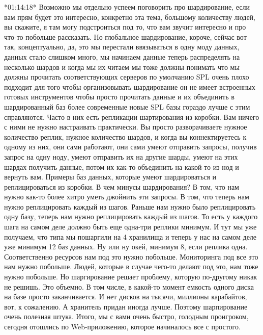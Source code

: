 \documentclass[12pt]{article} %
\begin{document}
*01:14:18*
Возможно мы отдельно успеем поговорить про шардирование, если вам прям будет это интересно, конкретно эта тема, большому количеству людей, вы скажите, я там могу подстроиться под то, что вам звучит интересно и про что-то побольше рассказать.  Но глобальное шардирование, короче, сейчас вот так, концептуально, да, это мы перестали ввязываться в одну моду данных, данных стало слишком много, мы начинаем данные теперь распределять на несколько шардов и когда мы их читаем мы тоже должны понимать что мы должны прочитать соответствующих серверов по умолчанию SPL очень плохо подходит для того чтобы организовывать шардирование он не имеет встроенных готовых инструментов чтобы просто прочитать данные и их объединить в шардированный баз более современные новые SPL базы гораздо лучше с этим справляются.  Часто в них есть репликации шартирования из коробки.  Вам ничего с ними не нужно настраивать практически.  Вы просто разворачиваете нужное количество реплик, нужное количество шардов, и когда вы коннектируетесь к одному из них, они сами работают, они сами умеют отправить запросы, получив запрос на одну ноду, умеют отправить их на другие шарды, умеют на этих шардах получить данные, потом их как-то объединить на какой-то из нод и вернуть вам.  Примеры баз данных, которые умеют шардироваться и реплицироваться из коробки.  В чем минусы шардирования?  В том, что нам нужно как-то более хитро уметь джойнить эти запросы.  В том, что теперь нам нужно реплицировать каждый из шагов.  Раньше нам нужно было реплицировать одну базу, теперь нам нужно реплицировать каждый из шагов.  То есть у каждого шага на самом деле должно быть еще одна-три реплики минимум.  И тут мы уже получаем, что типа мы пошаргили на 4 хранилища и теперь у нас на самом деле уже минимум 12 баз данных.  Ну или ну окей, минимум 8, если реплика одна.  Соответственно ресурсов нам под это нужно побольше.  Мониторинга под все это нам нужно побольше.  Людей, которые в случае чего-то делают под это, нам тоже нужно побольше.  Но шаргирование решает проблему, которую по-другому никак не решишь.  Это объемно. В том числе, в какой-то момент емкость одного диска на базе просто заканчивается.  И нет дисков на тысячи, миллионы карабайтов, вот, к сожалению.  А хранитель придан иногда лучше. Поэтому шарпирование очень полезная штука.  Итого, мы с вами очень быстро, голодным проигроком, сегодня отошлись по Web-приложению, которое начиналось все с простого.
\end{document}

